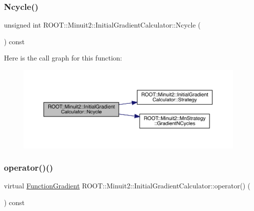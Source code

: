\subsubsection{\texorpdfstring{Ncycle()}{Ncycle()}\hspace{0.1cm}{\footnotesize\ttfamily [3/3]}}
{\footnotesize\ttfamily unsigned int R\+O\+O\+T\+::\+Minuit2\+::\+Initial\+Gradient\+Calculator\+::\+Ncycle (\begin{DoxyParamCaption}{ }\end{DoxyParamCaption}) const}

Here is the call graph for this function\+:
\nopagebreak
\begin{figure}[H]
\begin{center}
\leavevmode
\includegraphics[width=350pt]{d3/dcf/classROOT_1_1Minuit2_1_1InitialGradientCalculator_aef8f53869854439865a45497e011a41c_cgraph}
\end{center}
\end{figure}
\mbox{\label{classROOT_1_1Minuit2_1_1InitialGradientCalculator_ae3f248b2e9e40bc62ee7dc68c8ee010f}} 
\subsubsection{\texorpdfstring{operator()()}{operator()()}\hspace{0.1cm}{\footnotesize\ttfamily [1/6]}}
{\footnotesize\ttfamily virtual \mbox{\hyperlink{classROOT_1_1Minuit2_1_1FunctionGradient}{Function\+Gradient}} R\+O\+O\+T\+::\+Minuit2\+::\+Initial\+Gradient\+Calculator\+::operator() (\begin{DoxyParamCaption}\item[{const \mbox{\hyperlink{classROOT_1_1Minuit2_1_1MinimumParameters}{Minimum\+Parameters}} \&}]{ }\end{DoxyParamCaption}) const\hspace{0.3cm}{\ttfamily [virtual]}}



